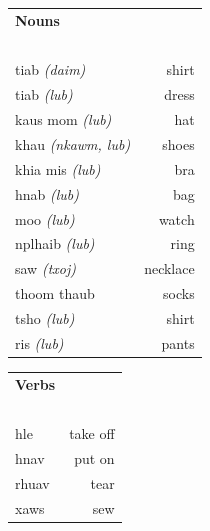 \documentclass{article}
\begin{document}
\clearpage

\begin{multicols}{2}
[
\section*{}
\begin{center}\rule{\textwidth}{.4pt}\end{center}
]

\begin{tabular}{l r}
\textbf{Nouns} \\
~\\
tiab {\em (daim)} &shirt\\
tiab {\em (lub)} &dress\\
kaus mom {\em (lub)} &hat\\
khau {\em (nkawm, lub)} &shoes\\
khia mis {\em (lub)} &bra\\
hnab {\em (lub)} &bag\\
moo {\em (lub)} &watch\\
nplhaib {\em (lub)} &ring\\
saw {\em (txoj)} &necklace\\
thoom thaub &socks\\
tsho {\em (lub)} &shirt\\
ris {\em (lub)} &pants\\
\end{tabular}

\begin{tabular}{l r}
\textbf{Verbs} \\
~\\
hle &take off\\
hnav &put on\\
rhuav &tear\\
xaws &sew\\
\end{tabular}

\end{multicols}

\clearpage
\end{document}
